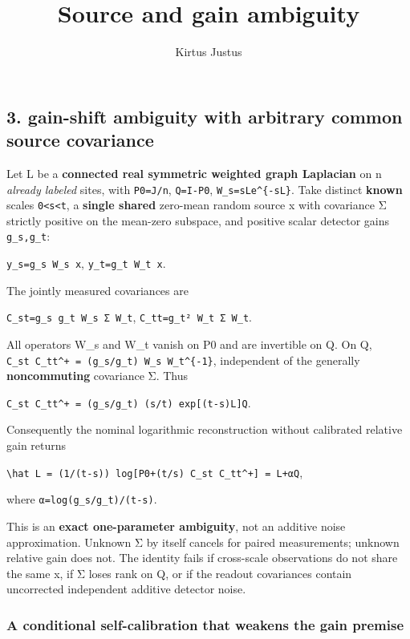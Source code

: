 \documentclass[
  10pt,
  a4paper,
]{article}
\title{Source and gain ambiguity}
\author{Kirtus Justus}
\date{}
\begin{document}
\maketitle

\subsection{3. gain-shift ambiguity with arbitrary common source covariance}\label{gain-shift-ambiguity-with-arbitrary-common-source-covariance}

Let L be a \textbf{connected real symmetric weighted graph Laplacian} on n \emph{already labeled} sites, with \texttt{P0=J/n}, \texttt{Q=I-P0}, \texttt{W\_s=sLe\^{}\{-sL\}}. Take distinct \textbf{known} scales \texttt{0\textless{}s\textless{}t}, a \textbf{single shared} zero-mean random source x with covariance Σ strictly positive on the mean-zero subspace, and positive scalar detector gains \texttt{g\_s,g\_t}:

\texttt{y\_s=g\_s\ W\_s\ x}, \texttt{y\_t=g\_t\ W\_t\ x}.

The jointly measured covariances are

\texttt{C\_st=g\_s\ g\_t\ W\_s\ Σ\ W\_t}, \texttt{C\_tt=g\_t²\ W\_t\ Σ\ W\_t}.

All operators W\_s and W\_t vanish on P0 and are invertible on Q. On Q, \texttt{C\_st\ C\_tt\^{}+\ =\ (g\_s/g\_t)\ W\_s\ W\_t\^{}\{-1\}}, independent of the generally \textbf{noncommuting} covariance Σ. Thus

\texttt{C\_st\ C\_tt\^{}+\ =\ (g\_s/g\_t)\ (s/t)\ exp{[}(t-s)L{]}Q}.

Consequently the nominal logarithmic reconstruction without calibrated relative gain returns

\texttt{\textbackslash{}hat\ L\ =\ (1/(t-s))\ log{[}P0+(t/s)\ C\_st\ C\_tt\^{}+{]}\ =\ L+αQ},

where \texttt{α=log(g\_s/g\_t)/(t-s)}.

This is an \textbf{exact one-parameter ambiguity}, not an additive noise approximation. Unknown Σ by itself cancels for paired measurements; unknown relative gain does not. The identity fails if cross-scale observations do not share the same x, if Σ loses rank on Q, or if the readout covariances contain uncorrected independent additive detector noise.

\subsubsection{A conditional self-calibration that weakens the gain premise}\label{a-conditional-self-calibration-that-weakens-the-gain-premise}
\end{document}
